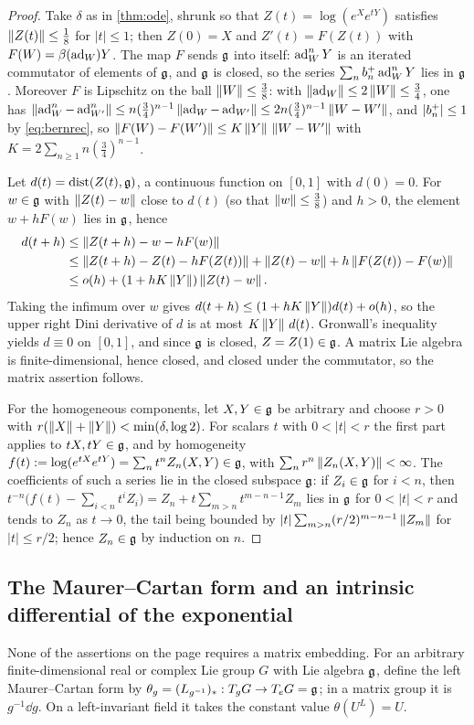 \begin{proof}
Take $\delta$ as in \cref{thm:ode}, shrunk so that $Z(t)=\log(e^Xe^{tY})$
satisfies $\left\lVert Z(t)\right\rVert\leq\tfrac18$ for $|t|\leq1$; then $Z(0)=X$ and
$Z'(t)=F(Z(t))$ with $F(W)=\beta(\operatorname{ad}_W)Y$. The map $F$ sends $\mathfrak{g}$ into
itself: $\operatorname{ad}_W^nY$ is an iterated commutator of elements of $\mathfrak{g}$, and $\mathfrak{g}$
is closed, so the series $\sum_nb^{+}_{n}\operatorname{ad}_W^nY$ lies in $\mathfrak{g}$. Moreover $F$
is Lipschitz on the ball $\left\lVert W\right\rVert\leq\tfrac38$: with
$\left\lVert\operatorname{ad}_W\right\rVert\leq2\left\lVert W\right\rVert\leq\tfrac34$, one has
$\left\lVert\operatorname{ad}_W^{n}-\operatorname{ad}_{W'}^{n}\right\rVert\leq n(\tfrac34)^{n-1}\left\lVert\operatorname{ad}_W-\operatorname{ad}_{W'}\right\rVert
\leq2n(\tfrac34)^{n-1}\left\lVert W-W'\right\rVert$, and $|b^{+}_{n}|\leq1$ by
\eqref{eq:bernrec}, so $\left\lVert F(W)-F(W')\right\rVert\leq K\left\lVert Y\right\rVert\,\left\lVert W-W'\right\rVert$ with
$K=2\sum_{n\geq1}n(\tfrac34)^{n-1}$.

Let $d(t)=\operatorname{dist}(Z(t),\mathfrak{g})$, a continuous function on $[0,1]$
with $d(0)=0$. For $w\in\mathfrak{g}$ with $\left\lVert Z(t)-w\right\rVert$ close to $d(t)$ (so that
$\left\lVert w\right\rVert\leq\tfrac38$) and $h>0$, the element $w+hF(w)$ lies in $\mathfrak{g}$, hence
\begin{align*}
 d(t+h)&\leq\left\lVert Z(t+h)-w-hF(w)\right\rVert\\
 &\leq\left\lVert Z(t+h)-Z(t)-hF(Z(t))\right\rVert+\left\lVert Z(t)-w\right\rVert+h\left\lVert F(Z(t))-F(w)\right\rVert\\
 &\leq o(h)+(1+hK\left\lVert Y\right\rVert)\left\lVert Z(t)-w\right\rVert.
\end{align*}
Taking the infimum over $w$ gives $d(t+h)\leq(1+hK\left\lVert Y\right\rVert)d(t)+o(h)$, so
the upper right Dini derivative of $d$ is at most $K\left\lVert Y\right\rVert\,d(t)$.
Gronwall's inequality yields $d\equiv0$ on $[0,1]$, and since $\mathfrak{g}$ is
closed, $Z=Z(1)\in\mathfrak{g}$. A matrix Lie algebra is finite-dimensional, hence
closed, and closed under the commutator, so the matrix assertion follows.

For the homogeneous components, let $X,Y\in\mathfrak{g}$ be arbitrary and choose
$r>0$ with $r(\left\lVert X\right\rVert+\left\lVert Y\right\rVert)<\min(\delta,\log2)$. For scalars $t$ with
$0<|t|<r$ the first part applies to $tX,tY\in\mathfrak{g}$, and by homogeneity
$f(t):=\log(e^{tX}e^{tY})=\sum_nt^nZ_n(X,Y)\in\mathfrak{g}$, with
$\sum_nr^n\left\lVert Z_n(X,Y)\right\rVert<\infty$. The coefficients of such a series lie in
the closed subspace $\mathfrak{g}$: if $Z_i\in\mathfrak{g}$ for $i<n$, then
$t^{-n}\bigl(f(t)-\sum_{i<n}t^iZ_i\bigr)=Z_n+t\sum_{m>n}t^{m-n-1}Z_m$ lies in
$\mathfrak{g}$ for $0<|t|<r$ and tends to $Z_n$ as $t\to0$, the tail being bounded by
$|t|\sum_{m>n}(r/2)^{m-n-1}\left\lVert Z_m\right\rVert$ for $|t|\leq r/2$; hence $Z_n\in\mathfrak{g}$ by
induction on $n$.
\end{proof}

\subsection{The Maurer--Cartan form and an intrinsic differential of the exponential}
None of the assertions on the page requires a matrix embedding. For an
arbitrary finite-dimensional real or complex Lie group $G$ with Lie algebra
$\mathfrak{g}$, define the left Maurer--Cartan form by
$\theta_g=(L_{g^{-1}})_*:T_gG\to T_eG=\mathfrak{g}$; in a matrix group it is
$g^{-1}\dd g$. On a left-invariant field it takes the constant value
$\theta(U^L)=U$.

